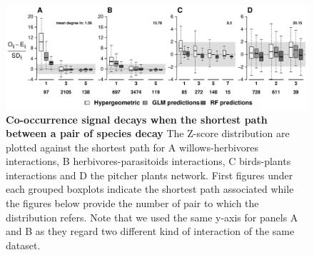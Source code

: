 \begin{figure}[htbp]
\centering
\includegraphics{chapitre3/figOrder.pdf}
\caption{\textbf{Co-occurrence signal decays when the shortest path
between a pair of species decay } The Z-score distribution are plotted
against the shortest path for A willows-herbivores interactions, B
herbivores-parasitoids interactions, C birds-plants interactions and D
the pitcher plants network. First figures under each grouped boxplots
indicate the shortest path associated while the figures below provide
the number of pair to which the distribution refers. Note that we used
the same y-axis for panels A and B as they regard two different kind of
interaction of the same dataset.\label{fig:shtpth}}
\end{figure}

\newpage

